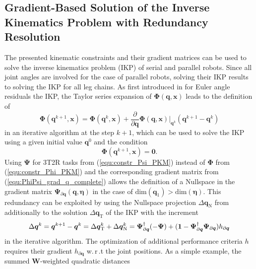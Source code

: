 \documentclass[robotics,article,submit,moreauthors,pdftex]{Definitions/mdpi}
\newcommand{\bm}[1]{\boldsymbol{#1}}
\begin{document}
\subsection{Gradient-Based Solution of the Inverse Kinematics Problem with Redundancy Resolution}
\label{sec:ZB_Anwendung_IK_grad}

The presented kinematic constraints and their gradient matrices can be used to solve the inverse kinematics problem (IKP) of serial and parallel robots.
Since all joint angles are involved for the case of parallel robots, solving their IKP results to solving the IKP for all leg chains.
As first introduced in \cite{GoldenbergBenFen1985} for Euler angle residuals the IKP, the Taylor series expansion of $\bm{\Phi}(\bm{q},\bm{x})$ leads to the definition of
%
\begin{equation}
\bm{\Phi}(\bm{q}^{k+1},\bm{x}) = 
\bm{\Phi}(\bm{q}^{k},\bm{x})
+
\frac{\partial}{\partial \bm{q}} \bm{\Phi}(\bm{q},\bm{x}) \biggr\rvert_{\bm{q}^k} (\bm{q}^{k+1} - \bm{q}^k)
\label{equ:taylor_phi}
\end{equation}
%
in an iterative algorithm at the step $k+1$, which can be used to solve the IKP using a given initial value $\bm{q}^{0}$ and the condition
\begin{equation}
\bm{\Phi}(\bm{q}^{k+1},\bm{x})=\bm{0}.
\end{equation}
Using $\bm{\Psi}$ for 3T2R tasks from (\ref{equ:constr_Psi_PKM}) instead of $\bm{\Phi}$ from (\ref{equ:constr_Phi_PKM}) and the corresponding gradient matrix from (\ref{equ:PhiPsi_grad_q_complete}) allows the definition of a Nullspace in the gradient matrix $\bm{\Psi}_{\partial \bm{q}}(\bm{q},\bm{\eta})$ in the case of $\mathrm{dim}(\bm{q}_1)>\mathrm{dim}(\bm{\eta})$.
This redundancy can be exploited by using the Nullspace projection ${\Delta}\bm{q}_{\mathrm{N}}$ from \cite{Yoshikawa1984} additionally to the solution ${\Delta}\bm{q}_{\mathrm{T}}$ of the IKP with the increment
%
\begin{equation}
{\Delta}\bm{q}^{k}
=
\bm{q}^{k+1} - \bm{q}^k
=
{\Delta}\bm{q}_{\mathrm{T}}^k + {\Delta}\bm{q}_{\mathrm{N}}^k \nonumber \\
=
\bm{\Psi}_{\partial\bm{q}}^{\dagger} (-\bm{\Psi}) +  (\bm{1}-\bm{\Psi}_{\partial\bm{q}}^{\dagger}\bm{\Psi}_{\partial\bm{q}}) h_{\partial\bm{q}}
\label{equ:nullspace}
\end{equation}
%
in the iterative algorithm.
The optimization of additional performance criteria $h$ requires their gradient $h_{\partial\bm{q}}$ w.\,r\,.t the joint positions.
As a simple example, the summed $\bm{W}$-weighted quadratic distances
\end{document}
